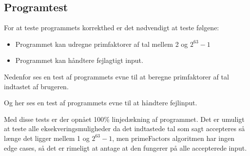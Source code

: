 \subsection{Programtest}
For at teste programmets korrekthed er det nødvendigt at teste følgene:
\begin{itemize}
\item Programmet kan udregne primfaktorer af tal mellem 2 og $2^{63}-1$ 
\item Programmet kan håndtere fejlagtigt input.
\end{itemize}
Nedenfor ses en test af programmets evne til at beregne primfaktorer af tal indtastet af brugeren.

Og her ses en test af programmets evne til at håndtere fejlinput.

Med disse tests er der opnået 100\% linjedækning af programmet. Det er umuligt at teste alle eksekveringsmuligheder da det indtastede tal som sagt accepteres så længe det ligger mellem 1 og $2^{63}-1$, men primeFactors algoritmen har ingen edge cases, så det er rimeligt at antage at den fungerer på alle accepterede input.
